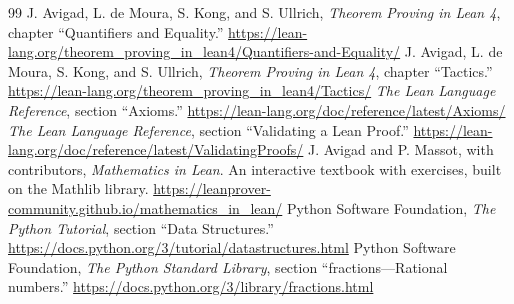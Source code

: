 \begin{thebibliography}{99}
 J. Avigad, L. de Moura, S. Kong, and S. Ullrich, \emph{Theorem Proving in Lean 4}, chapter ``Quantifiers and Equality.'' \url{https://lean-lang.org/theorem_proving_in_lean4/Quantifiers-and-Equality/}
 J. Avigad, L. de Moura, S. Kong, and S. Ullrich, \emph{Theorem Proving in Lean 4}, chapter ``Tactics.'' \url{https://lean-lang.org/theorem_proving_in_lean4/Tactics/}
 \emph{The Lean Language Reference}, section ``Axioms.'' \url{https://lean-lang.org/doc/reference/latest/Axioms/}
 \emph{The Lean Language Reference}, section ``Validating a Lean Proof.'' \url{https://lean-lang.org/doc/reference/latest/ValidatingProofs/}
 J. Avigad and P. Massot, with contributors, \emph{Mathematics in Lean}. An interactive textbook with exercises, built on the Mathlib library. \url{https://leanprover-community.github.io/mathematics_in_lean/}
 Python Software Foundation, \emph{The Python Tutorial}, section ``Data Structures.'' \url{https://docs.python.org/3/tutorial/datastructures.html}
 Python Software Foundation, \emph{The Python Standard Library}, section ``fractions---Rational numbers.'' \url{https://docs.python.org/3/library/fractions.html}
\end{thebibliography}
\par\medskip{}
